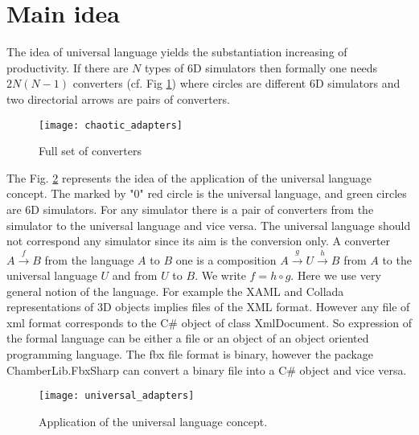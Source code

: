 \documentclass[10pt,journal,compsoc]{IEEEtran}
\begin{document}
	
	
		\section{Main idea}
	The idea of universal language yields the substantiation  increasing of productivity. 	If there are $N$ types of 6D simulators  then formally one needs $2N\left( N-1\right) $ converters (cf. Fig \ref{fig_sim}) where circles are different 6D simulators and two directorial arrows are pairs of converters.	
		\begin{figure}[!t]
		\centering
		\texttt{[image: chaotic\_adapters]}
		\caption{Full set of converters}
		\label{fig_sim}
	\end{figure}
	The Fig. \ref{fig_uni} represents the idea of the  application of the universal language concept. The marked by "0" red circle is the universal language, and green circles are 6D simulators. For any simulator there is a pair of converters from the simulator to the universal language and vice versa.  The universal language should not correspond any simulator since its aim is the conversion only. A converter $A \xrightarrow{f} B$ from the language $A$ to $B$ one is a composition $A\xrightarrow{g} U \xrightarrow{h} B$ from $A$ to the universal language $U$ and from $U$ to $B$. We write $f = h \circ g$. Here we use very general notion of the language. For example the XAML and Collada representations of 3D objects implies files of the XML format. However any file of xml format corresponds to the C\# object of class XmlDocument. So expression of the formal language can be either a file or an object of an object oriented programming language. The fbx file format is binary, however the  package ChamberLib.FbxSharp can convert a binary file into  a  C\# object and vice versa.
	
			\begin{figure}[!t]
		\centering
		\texttt{[image: universal\_adapters]}
		\caption{Application of the universal language concept.}
		\label{fig_uni}
	\end{figure}
	
\end{document}
